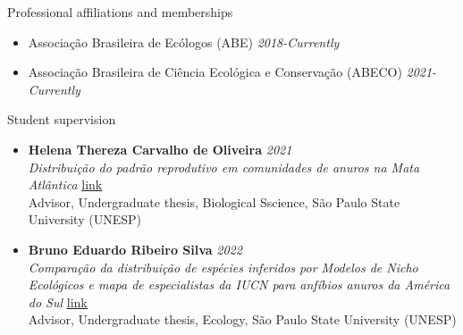 \documentclass{resume}
\begin{document}

\begin{rSection}{Professional affiliations and memberships}
\begin{itemize}
\item Associação Brasileira de Ecólogos (ABE) \hfill{\em 2018-Currently}
\item Associação Brasileira de Ciência Ecológica e Conservação (ABECO) \hfill{\em 2021-Currently}
\end{itemize}
\end{rSection}


\begin{rSection}{Student supervision}
\begin{itemize}
\item {\bf Helena Thereza Carvalho de Oliveira} \hfill{\em 2021}\\
{\it Distribuição do padrão reprodutivo em comunidades de anuros na Mata Atlântica} \href{https://repositorio.unesp.br/items/c8b867f6-4fd0-4e07-853a-abbf74d64c23}{\underline{link}}\\
Advisor, Undergraduate thesis, Biological Sscience, São Paulo State University (UNESP)

\item {\bf Bruno Eduardo Ribeiro Silva} \hfill{\em 2022}\\
{\it Comparação da distribuição de espécies inferidos por Modelos de Nicho Ecológicos e mapa de especialistas da IUCN para anfíbios anuros da América do Sul} \href{https://repositorio.unesp.br/items/190f34f7-f0a7-4458-9dfc-ef8890bf0ca2}{\underline{link}}\\
Advisor, Undergraduate thesis, Ecology, São Paulo State University (UNESP)
\end{itemize}
\end{rSection}

\end{document}
